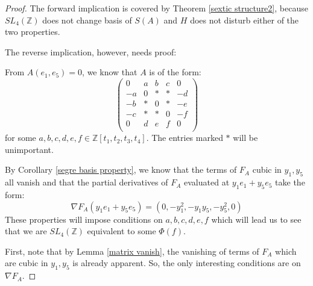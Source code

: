 \documentclass{article}
\begin{document}
\begin{proof}

The forward implication is covered by Theorem \ref{sextic structure2}, because $SL_4(\mathbb{Z})$ does not change basis of $S(A)$ and $H$ does not disturb either of the two properties.

The reverse implication, however, needs proof:

From $A(e_1,e_5) = 0$, we know that $A$ is of the form:
\begin{equation}
\begin{pmatrix}
0 & a & b & c & 0 \\
- a & 0 & * & * & - d \\
- b & * & 0 & * & - e \\
- c & * & * & 0 & - f \\
0 & d & e & f & 0 \\
\end{pmatrix}
\end{equation}
for some $a,b,c,d,e,f \in \mathbb{Z}[t_1,t_2,t_3,t_4]$.  The entries marked $*$ will be unimportant.

By Corollary \ref{segre basis property}, we know that the terms of $F_A$ cubic in $y_1, y_5$ all vanish and that the partial derivatives of $F_A$ evaluated at $y_1 e_1 + y_5 e_5$ take the form:
\begin{equation}
\nabla F_A (y_1 e_1 + y_5 e_5) = (0, - y_1^2, - y_1 y_5, - y_5^2, 0)
\end{equation}
These properties will impose conditions on $a,b,c,d,e,f$ which will lead us to see that we are $SL_4(\mathbb{Z})$ equivalent to some $\Phi(f)$.

First, note that by Lemma \ref{matrix vanish}, the vanishing of terms of $F_A$ which are cubic in $y_1, y_5$ is already apparent.  So, the only interesting conditions are on $\nabla F_A$.


\end{proof}
\end{document}
